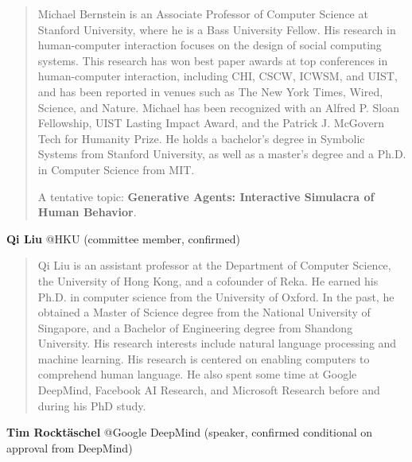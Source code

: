\documentclass[10pt]{article} %
\begin{document}
\begin{quote}
    Michael Bernstein is an Associate Professor of Computer Science at Stanford University, where he is a Bass University Fellow. His research in human-computer interaction focuses on the design of social computing systems. This research has won best paper awards at top conferences in human-computer interaction, including CHI, CSCW, ICWSM, and UIST, and has been reported in venues such as The New York Times, Wired, Science, and Nature. Michael has been recognized with an Alfred P. Sloan Fellowship, UIST Lasting Impact Award, and the Patrick J. McGovern Tech for Humanity Prize. He holds a bachelor's degree in Symbolic Systems from Stanford University, as well as a master's degree and a Ph.D. in Computer Science from MIT.  

A tentative topic: {\bf Generative Agents: Interactive Simulacra of Human Behavior}.
\end{quote}



{\bf Qi Liu} @HKU (committee member, confirmed)  

\begin{quote}
    Qi Liu is an assistant professor at the Department of Computer Science, the University of Hong Kong, and a cofounder of Reka. He earned his Ph.D. in computer science from the University of Oxford. In the past, he obtained a Master of Science degree from the National University of Singapore, and a Bachelor of Engineering degree from Shandong University. His research interests include natural language processing and machine learning. His research is centered on enabling computers to comprehend human language. He also spent some time at Google DeepMind, Facebook AI Research, and Microsoft Research before and during his PhD study.
\end{quote}



{\bf Tim Rocktäschel} @Google DeepMind (speaker, confirmed conditional on approval from DeepMind)  
\end{document}
